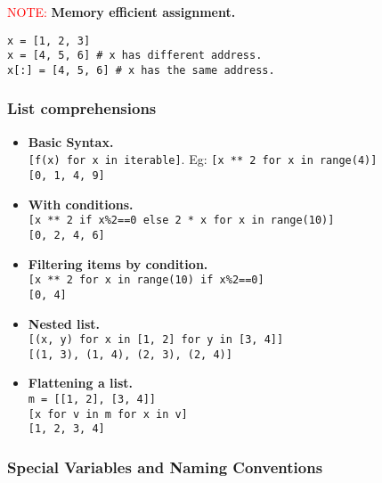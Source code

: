 \vspace{4pt}
\textcolor{red}{NOTE:} \textbf{Memory efficient assignment.}\\
\vspace{-8pt}
\begin{verbatim}
x = [1, 2, 3]  
x = [4, 5, 6] # x has different address.
x[:] = [4, 5, 6] # x has the same address.
\end{verbatim}


\subsubsection{List comprehensions}
\begin{itemize}
\item \textbf{Basic Syntax.}\\
            \texttt{[f(x) for x in iterable]}.
            Eg: \texttt{[x ** 2 for x in range(4)]}\\
            \texttt{[0, 1, 4, 9]}
\item \textbf{With conditions.}\\ 
            \texttt{[x ** 2 if x\%2==0 else 2 * x for x in range(10)]}\\
            \texttt{[0, 2, 4, 6]}
\item \textbf{Filtering items by condition.}\\
            \texttt{[x ** 2 for x in range(10) if x\%2==0]}\\
            \texttt{[0, 4]}
\item \textbf{Nested list.}\\
            \texttt{[(x, y) for x in [1, 2] for y in [3, 4]]}\\
            \texttt{[(1, 3), (1, 4), (2, 3), (2, 4)]}
\item \textbf{Flattening a list.}\\
            \texttt{m = [[1, 2], [3, 4]]}\\
            \texttt{[x for v in m for x in v]}\\
            \texttt{[1, 2, 3, 4]}
\end{itemize}



\subsubsection{Special Variables and Naming Conventions}

